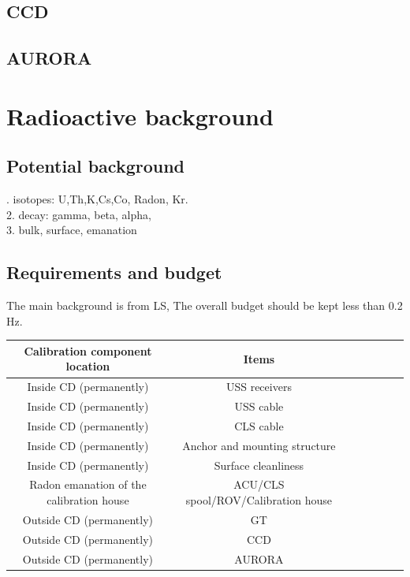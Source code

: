 \documentclass[review,number,sort&compress]{elsarticle}
\begin{document}
\subsection{CCD}

\subsection{AURORA}

\section{Radioactive background}
\subsection{Potential background}

. isotopes: U,Th,K,Cs,Co, Radon, Kr. \\
2. decay: gamma, beta, alpha,\\
3. bulk, surface, emanation\\

\subsection{Requirements and budget}

The main background is from LS, 
The overall budget should be kept less than 0.2 Hz.

\begin{center}
	\centering
	\begin{tabular*}{150mm}{@{\extracolsep{\fill}}ccccccc}
		\toprule  %
               Calibration component location & Items\\
		\midrule  %
	       Inside CD (permanently) & USS receivers\\
               Inside CD (permanently) & USS cable\\
               Inside CD (permanently) & CLS cable\\
               Inside CD (permanently) & Anchor and mounting structure\\
               Inside CD (permanently) & Surface cleanliness\\
		\midrule  %
	       Radon emanation of the calibration house & ACU/CLS spool/ROV/Calibration house\\
		\midrule  %
		Outside CD (permanently) & GT\\
		Outside CD (permanently) & CCD \\
		Outside CD (permanently) & AURORA\\
		 \bottomrule  %
\end{tabular*}
\end{center}
\end{document}
